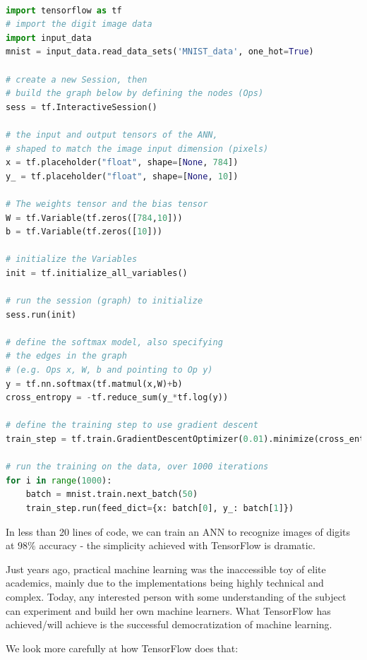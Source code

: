 \documentclass[12pt]{article}  %
\begin{document}
\begin{lstlisting}[language=Python]

import tensorflow as tf
# import the digit image data
import input_data
mnist = input_data.read_data_sets('MNIST_data', one_hot=True)

# create a new Session, then 
# build the graph below by defining the nodes (Ops)
sess = tf.InteractiveSession()

# the input and output tensors of the ANN, 
# shaped to match the image input dimension (pixels)
x = tf.placeholder("float", shape=[None, 784])
y_ = tf.placeholder("float", shape=[None, 10])

# The weights tensor and the bias tensor
W = tf.Variable(tf.zeros([784,10]))
b = tf.Variable(tf.zeros([10]))

# initialize the Variables
init = tf.initialize_all_variables()

# run the session (graph) to initialize
sess.run(init)

# define the softmax model, also specifying 
# the edges in the graph 
# (e.g. Ops x, W, b and pointing to Op y)
y = tf.nn.softmax(tf.matmul(x,W)+b)
cross_entropy = -tf.reduce_sum(y_*tf.log(y))

# define the training step to use gradient descent
train_step = tf.train.GradientDescentOptimizer(0.01).minimize(cross_entropy)

# run the training on the data, over 1000 iterations
for i in range(1000):
	batch = mnist.train.next_batch(50)
	train_step.run(feed_dict={x: batch[0], y_: batch[1]})
\end{lstlisting}


In less than 20 lines of code, we can train an ANN to recognize images of digits at $98\%$ accuracy - the simplicity achieved with TensorFlow is dramatic. 

Just years ago, practical machine learning was the inaccessible toy of elite academics, mainly due to the implementations being highly technical and complex. Today, any interested person with some understanding of the subject can experiment and build her own machine learners. What TensorFlow has achieved/will achieve is the successful democratization of machine learning.

We look more carefully at how TensorFlow does that:
\end{document}
